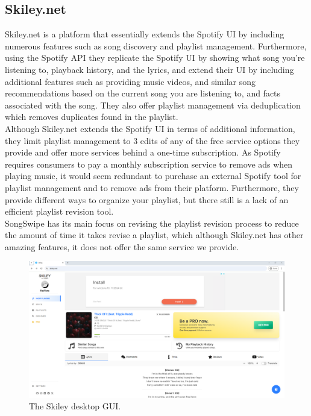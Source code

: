 \documentclass{article}
\begin{document}
\pagebreak

\subsection{Skiley.net}
\quad Skiley.net is a platform that essentially extends the Spotify UI by including numerous features such as song discovery and playlist management. Furthermore, using the Spotify API they replicate the Spotify UI by showing what song you’re listening to, playback history, and the lyrics,  and extend their UI by including additional features such as providing music videos, and similar song recommendations based on the current song you are listening to, and facts associated with the song. They also offer playlist management via deduplication which removes duplicates found in the playlist. \cite{skiley} \\

Although Skiley.net extends the Spotify UI in terms of additional information, they limit playlist management to 3 edits of any of the free service options they provide and offer more services behind a one-time subscription. As Spotify requires consumers to pay a monthly subscription service to remove ads when playing music, it would seem redundant to purchase an external Spotify tool for playlist management and to remove ads from their platform. Furthermore, they provide different ways to organize your playlist, but there still is a lack of an efficient playlist revision tool.\\
SongSwipe has its main focus on revising the playlist revision process to reduce the amount of time it takes revise a playlist, which although Skiley.net has other amazing features, it does not offer the same service we provide.

\begin{figure}[ht]
  \centering
  \includegraphics[width=\textwidth]{./skileyss.png}
  \caption{The Skiley desktop GUI.}
  \label{fig:skiley}
\end{figure}
\end{document}
